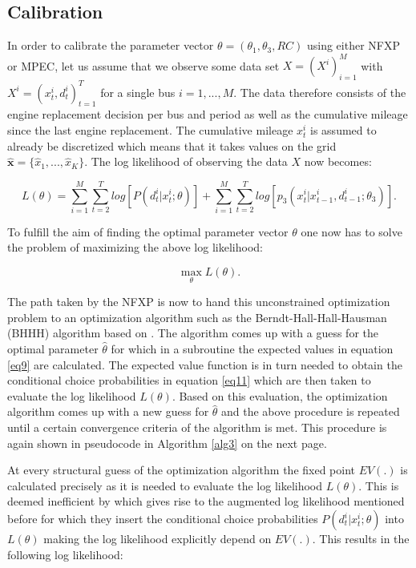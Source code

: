 \subsection{Calibration}

In order to calibrate the parameter vector $\theta =(\theta_1, \theta_3, RC)$ using either NFXP or MPEC, let us assume that we observe some data set $X = (X^i)^M_{i=1 }$ with $X^i = (x^i_t, d^i_t)^T_{t=1}$ for a single bus $i = 1, ..., M$. The data therefore consists of the engine replacement decision per bus and period as well as the cumulative mileage since the last engine replacement. The cumulative mileage $x^i_t$ is assumed to already be discretized which means that it takes values on the grid $\mathbf{\hat x} = \{\hat x_1, ..., \hat x_K\}$. The log likelihood of observing the data $X$ now becomes:

\begin{equation}
	L(\theta) = \sum_{i=1}^{M} \sum_{t=2}^{T} log[P(d^i_t|x^i_t; \theta)] + \sum_{i=1}^{M} \sum_{t=2}^{T} log[p_3(x^i_t|x^i_{t-1}, d^i_{t-1}; \theta_3)].
\end{equation}

To fulfill the aim of finding the optimal parameter vector $\theta$ one now has to solve the problem of maximizing the above log likelihood:

\begin{equation}
	\max_{\theta} L(\theta).
\end{equation}

The path taken by the NFXP is now to hand this unconstrained optimization problem to an optimization algorithm such as the Berndt-Hall-Hall-Hausman (BHHH) algorithm based on \cite{Berndt.1974}. The algorithm comes up with a guess for the optimal parameter $\hat \theta$ for which in a subroutine the expected values in equation \ref{eq9} are calculated. The expected value function is in turn needed to obtain the conditional choice probabilities in equation \ref{eq11} which are then taken to evaluate the log likelihood $L(\theta)$. Based on this evaluation, the optimization algorithm comes up with a new guess for $\hat \theta$ and the above procedure is repeated until a certain convergence criteria of the algorithm is met. This procedure is again shown in pseudocode in Algorithm \ref{alg3} on the next page.

At every structural guess of the optimization algorithm the fixed point $EV(.)$ is calculated precisely as it is needed to evaluate the log likelihood $L(\theta)$. This is deemed inefficient by \citeauthor{Su.Judd.2012} which gives rise to the augmented log likelihood mentioned before for which they insert the conditional choice probabilities $P(d^i_t|x^i_t; \theta)$ into $L(\theta)$ making the log likelihood explicitly depend on $EV(.)$. This results in the following log likelihood:

